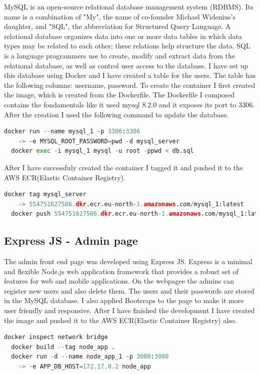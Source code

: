 \documentclass[11pt,a4paper,oneside]{report}
\begin{document}
MySQL is an open-source relational database management system (RDBMS). Its name is a combination of "My", the name of co-founder Michael Widenius's daughter, and "SQL", the abbreviation for Structured Query Language. A relational database organizes data into one or more data tables in which data types may be related to each other; these relations help structure the data. SQL is a language programmers use to create, modify and extract data from the relational database, as well as control user access to the database.
I have set up this database using Docker and I have created a table for the users. The table has the following columns: username, password. To create the container I first created the image, which is created from the Dockerfile. The Dockerfile I composed contains the fondamentals like it used mysql 8.2.0 and it exposes its port to 3306.
After the creation I used the following command to update the database.
\begin{lstlisting}[language=Python,basicstyle=\ttfamily\small,]
  docker run --name mysql_1 -p 3306:3306 
    -> -e MYSQL_ROOT_PASSWORD=pwd -d mysql_server
  docker exec -i mysql_1 mysql -u root -ppwd < db.sql
\end{lstlisting}
After I have successfuly created the container I tagged it and pushed it to the AWS ECR(Elastic Container Registry).

\begin{lstlisting}[language=Python,basicstyle=\ttfamily\small,]
  docker tag mysql_server 
    -> 554751627586.dkr.ecr.eu-north-1.amazonaws.com/mysql_1:latest
  docker push 554751627586.dkr.ecr.eu-north-1.amazonaws.com/mysql_1:latest
\end{lstlisting}

\subsection{Express JS - Admin page}

The admin front end page was developed using Express JS. Express is a minimal and flexible Node.js web application framework that provides a robust set of features for web and mobile applications.
On the webpagee the admins can register new users and also delete them. The users and their passwords are stored in the MySQL database. I also applied Bootsraps to the page to make it more user friendly and responsive.
After I have finished the development I have created the image and pushed it to the AWS ECR(Elastic Container Registry) also.
\begin{lstlisting}[language=Python,basicstyle=\ttfamily\small,]
  docker inspect network bridge
  docker build --tag node_app .   
  docker run -d --name node_app_1 -p 3000:3000 
    -> -e APP_DB_HOST=172.17.0.2 node_app
\end{lstlisting}
\end{document}

